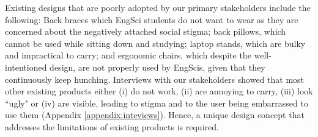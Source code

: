 \documentclass[11pt]{article}
\begin{document}
Existing designs that are poorly adopted by our primary stakeholders include the following: Back braces which EngSci students do not want to wear as they are concerned about the negatively attached social stigma; back pillows, which cannot be used while sitting down and studying; laptop stands, which are bulky and impractical to carry; and ergonomic chairs, which despite the well-intentioned design, are not properly used by EngScis, given that they continuously keep hunching. Interviews with our stakeholders showed that most other existing products either (i) do not work, (ii) are annoying to carry, (iii) look ``ugly" or (iv) are visible, leading to stigma and to the user being embarrassed to use them (Appendix \ref{appendix:inteviews}). Hence, a unique design concept that addresses the limitations of existing products is required. 


\end{document}
